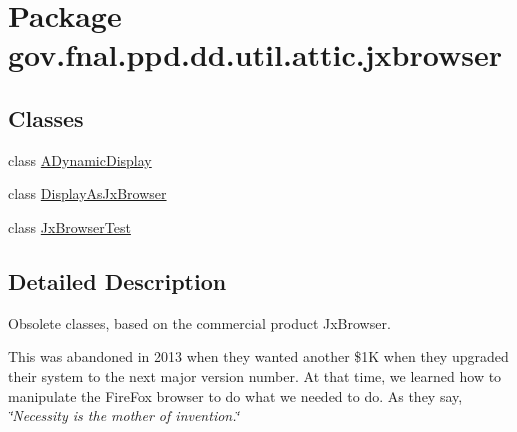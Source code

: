 \hypertarget{namespacegov_1_1fnal_1_1ppd_1_1dd_1_1util_1_1attic_1_1jxbrowser}{\section{Package gov.\-fnal.\-ppd.\-dd.\-util.\-attic.\-jxbrowser}
\label{namespacegov_1_1fnal_1_1ppd_1_1dd_1_1util_1_1attic_1_1jxbrowser}
}
\subsection*{Classes}
\begin{DoxyCompactItemize}
\item 
class \hyperlink{classgov_1_1fnal_1_1ppd_1_1dd_1_1util_1_1attic_1_1jxbrowser_1_1ADynamicDisplay}{A\-Dynamic\-Display}
\item 
class \hyperlink{classgov_1_1fnal_1_1ppd_1_1dd_1_1util_1_1attic_1_1jxbrowser_1_1DisplayAsJxBrowser}{Display\-As\-Jx\-Browser}
\item 
class \hyperlink{classgov_1_1fnal_1_1ppd_1_1dd_1_1util_1_1attic_1_1jxbrowser_1_1JxBrowserTest}{Jx\-Browser\-Test}
\end{DoxyCompactItemize}


\subsection{Detailed Description}
Obsolete classes, based on the commercial product Jx\-Browser.

This was abandoned in 2013 when they wanted another \$1\-K when they upgraded their system to the next major version number. At that time, we learned how to manipulate the Fire\-Fox browser to do what we needed to do. As they say, {\itshape \char`\"{}\-Necessity is the mother of invention.\char`\"{}}